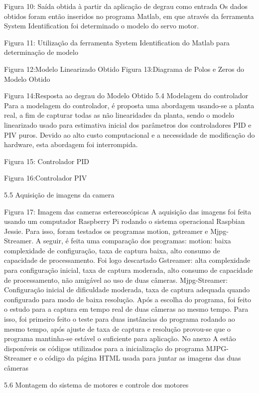 Figura 10: Saída obtida à partir da aplicação de degrau como entrada
Os dados obtidos foram então inseridos no programa Matlab, em que através da ferramenta System Identification foi determinado o modelo do servo motor.

Figura 11: Utilização da ferramenta System Identification do Matlab para determinação de modelo

Figura 12:Modelo Linearizado Obtido Figura 13:Diagrama de Polos e Zeros do Modelo Obtido

Figura 14:Resposta ao degrau do Modelo Obtido
5.4	Modelagem do controlador
Para a modelagem do controlador, é proposta uma abordagem usando-se a planta real, a fim de capturar todas as não linearidades da planta, sendo o modelo linearizado usado para estimativa inicial dos parâmetros dos controladores PID e PIV puros.
Devido ao alto custo computacional e a necessidade de modificação do hardware, esta abordagem foi interrompida.

Figura 15: Controlador PID

Figura 16:Controlador PIV

5.5	Aquisição de imagens da camera

Figura 17: Imagem das cameras estereoscópicas
A aquisição das imagens foi feita usando um computador Raspberry Pi rodando o sistema operacional Raspbian Jessie. Para isso, foram testados os programas motion, gstreamer e Mjpg-Streamer. A seguir,  é feita uma comparação dos programas:
motion: baixa complexidade de configuração, taxa de captura baixa, alto consumo de capacidade de processamento. Foi logo descartado
Gstreamer: alta complexidade para configuração inicial, taxa de captura moderada, alto consumo de capacidade de processamento, não amigável ao uso de duas câmeras.
Mjpg-Streamer: Configuração inicial de dificuldade moderada, taxa de captura adequada quando configurado para modo de baixa resolução.
Após a escolha do programa, foi feito o estudo para a captura em tempo real de duas câmeras ao mesmo tempo. Para isso, foi primeiro feito o teste para duas instâncias do programa rodando ao mesmo tempo, após ajuste de taxa de captura e resolução provou-se que o programa mantinha-se estável o suficiente para aplicação.  No anexo A estão disponíveis os códigos utilizados para a inicialização do programa MJPG-Streamer e o código da página HTML usada para juntar as imagens das duas câmeras 



5.6	Montagem do sistema de motores e controle dos motores

